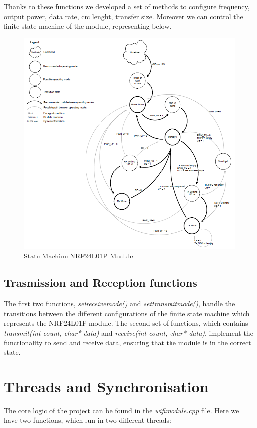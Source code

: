 \documentclass[11pt,a4paper,oneside]{article}
\begin{document}
Thanks to these functions we developed a set of methods to configure frequency, output power, data rate, crc lenght, transfer size. Moreover we can control the finite state machine of the module, representing below.
\begin{figure}[H]
\centering
\includegraphics[scale=0.3]{./Immagini/stateMachineModule.png}
\caption{State Machine NRF24L01P Module}
\label{State Machine NRF24L01P Module}
\end{figure}


\subsection{Trasmission and Reception functions}
The first two functions, {\itshape set\textunderscore receive\textunderscore mode()} and {\itshape set\textunderscore transmit\textunderscore mode()}, handle the transitions between the different configurations of the finite state machine which represents the NRF24L01P module. The second set of functions, which contains {\itshape transmit(int count, char* data)} and {\itshape receive(int count, char* data)}, implement the functionality to send and receive data, ensuring that the module is in the correct state.

\newpage
\section{Threads and Synchronisation}
The core logic of the project can be found in the {\itshape wifi\textunderscore module.cpp} file. Here we have two functions, which run in two different threads:
\end{document}

